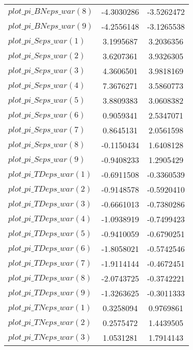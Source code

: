 \begin{center}
\begin{longtable}{lcc}
$plot\_pi\_BN eps\_war (8)   $	 & 	     -4.3030286	 & 	     -3.5262472 \\ 
$plot\_pi\_BN eps\_war (9)   $	 & 	     -4.2556148	 & 	     -3.1265538 \\ 
$plot\_pi\_S eps\_war (1)    $	 & 	      3.1995687	 & 	      3.2036356 \\ 
$plot\_pi\_S eps\_war (2)    $	 & 	      3.6207361	 & 	      3.9326305 \\ 
$plot\_pi\_S eps\_war (3)    $	 & 	      4.3606501	 & 	      3.9818169 \\ 
$plot\_pi\_S eps\_war (4)    $	 & 	      7.3676271	 & 	      3.5860773 \\ 
$plot\_pi\_S eps\_war (5)    $	 & 	      3.8809383	 & 	      3.0608382 \\ 
$plot\_pi\_S eps\_war (6)    $	 & 	      0.9059341	 & 	      2.5347071 \\ 
$plot\_pi\_S eps\_war (7)    $	 & 	      0.8645131	 & 	      2.0561598 \\ 
$plot\_pi\_S eps\_war (8)    $	 & 	     -0.1150434	 & 	      1.6408128 \\ 
$plot\_pi\_S eps\_war (9)    $	 & 	     -0.9408233	 & 	      1.2905429 \\ 
$plot\_pi\_TD eps\_war (1)   $	 & 	     -0.6911508	 & 	     -0.3360539 \\ 
$plot\_pi\_TD eps\_war (2)   $	 & 	     -0.9148578	 & 	     -0.5920410 \\ 
$plot\_pi\_TD eps\_war (3)   $	 & 	     -0.6661013	 & 	     -0.7380286 \\ 
$plot\_pi\_TD eps\_war (4)   $	 & 	     -1.0938919	 & 	     -0.7499423 \\ 
$plot\_pi\_TD eps\_war (5)   $	 & 	     -0.9410059	 & 	     -0.6790251 \\ 
$plot\_pi\_TD eps\_war (6)   $	 & 	     -1.8058021	 & 	     -0.5742546 \\ 
$plot\_pi\_TD eps\_war (7)   $	 & 	     -1.9114144	 & 	     -0.4672451 \\ 
$plot\_pi\_TD eps\_war (8)   $	 & 	     -2.0743725	 & 	     -0.3742221 \\ 
$plot\_pi\_TD eps\_war (9)   $	 & 	     -1.3263625	 & 	     -0.3011333 \\ 
$plot\_pi\_TN eps\_war (1)   $	 & 	      0.3258094	 & 	      0.9769861 \\ 
$plot\_pi\_TN eps\_war (2)   $	 & 	      0.2575472	 & 	      1.4439505 \\ 
$plot\_pi\_TN eps\_war (3)   $	 & 	      1.0531281	 & 	      1.7914143 \\ 

\end{longtable}
\end{center}

